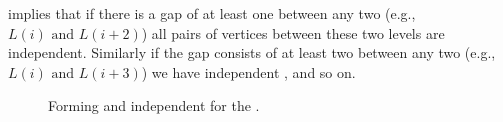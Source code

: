 implies that if there is a gap of at least
one \level between any two \levels (e.g., $L(i) \mbox{ and } L(i+2)$) all
pairs of vertices between these two levels are \DONE independent. Similarly
if the gap consists of at least two \levels between any two
\levels (e.g., $L(i) \mbox{ and } L(i+3)$) we have \DTWO independent
\levels, and so on.
 \begin{figure}[t]
 	\centering
 	\hspace{2.5em}
 	\caption{Forming \DONE and \DTWO independent \levelGroups for the \stex.}
 	\label{fig:2d-7pt_d1_d2}
 \end{figure}
 
